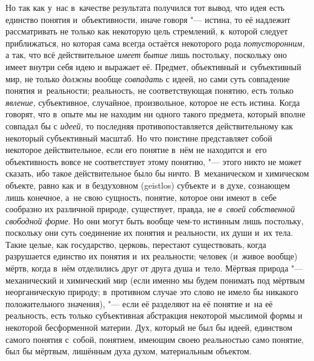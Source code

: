 Но так как у~нас в~качестве результата получился тот вывод,
что идея есть единство понятия и~объективности, иначе говоря
"--- истина, то её надлежит рассматривать не только как
некоторую цель стремлений, к~которой следует приближаться, но которая сама
всегда остаётся некоторого рода
{\em потусторонним,} а
так, что всё действительное {\em имеет
бытие} лишь постольку, поскольку оно имеет внутри себя идею
и выражает её. Предмет, объективный и~субъективный мир, не только
{\em должны} вообще
{\em совпадать}
с идеей, но сами суть совпадение понятия и~реальности;
реальность, не соответствующая понятию, есть только
{\em явление,}
субъективное, случайное, произвольное, которое не есть
истина. Когда говорят, что в~опыте мы не находим ни одного такого предмета,
который вполне совпадал бы с
{\em идеей,} то последняя
противопоставляется действительному как некоторый
субъективный масштаб. Но что поистине представляет собой некоторое
действительное, если его понятие в~нём не находится и~его объективность
вовсе не соответствует этому понятию, "--- этого никто не может
сказать, ибо такое действительное было бы ничто. В~механическом и
химическом объекте, равно как и~в бездуховном (geistlos)
субъекте и~в духе, сознающем лишь конечное, а~не свою
сущность, понятие, которое они имеют в~себе сообразно их различной природе,
существует, правда, не {\em в~своей
собственной свободной форме}. Но они могут быть вообще
чем-то истинным лишь постольку, поскольку они суть соединение их понятия и
реальности, их души и~их тела. Такие целые, как государство, церковь,
перестают существовать, когда разрушается единство их понятия и~их
реальности; человек (и~живое вообще) мёртв, когда в~нём отделились друг от
друга душа и~тело. Мёртвая природа "--- механический и
химический мир (если именно мы будем понимать под мёртвым неорганическую
природу; в~противном случае это слово не имело бы никакого положительного
значения), "--- если её разделяют на её понятие и~на её
реальность, есть только субъективная абстракция некоторой мыслимой формы и
некоторой бесформенной материи. Дух, который не был бы идеей, единством
самого понятия с~собой, понятием, имеющим своею реальностью само понятие,
был бы мёртвым, лишённым духа духом, материальным объектом.

